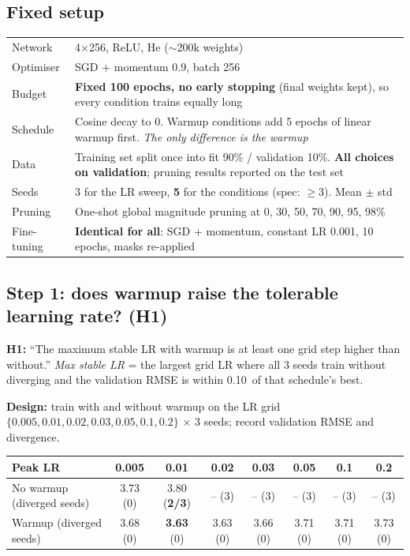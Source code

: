 \documentclass[11pt,a4paper]{article}
\newcommand{\A}{\,\text{\AA}}
\begin{document}
\subsection{Fixed setup}
\begin{tabularx}{\linewidth}{@{}lY@{}}
\toprule
Network & 4$\times$256, ReLU, He ($\sim$200k weights) \\
Optimiser & SGD + momentum 0.9, batch 256 \\
Budget & \textbf{Fixed 100 epochs, no early stopping} (final weights kept), so every condition trains equally long \\
Schedule & Cosine decay to 0. Warmup conditions add 5 epochs of linear warmup first. \emph{The only difference is the warmup} \\
Data & Training set split once into fit 90\% / validation 10\%. \textbf{All choices on validation}; pruning results reported on the test set \\
Seeds & 3 for the LR sweep, \textbf{5} for the conditions (spec: $\geq 3$). Mean $\pm$ std \\
Pruning & One-shot global magnitude pruning at 0, 30, 50, 70, 90, 95, 98\% \\
Fine-tuning & \textbf{Identical for all}: SGD + momentum, constant LR 0.001, 10 epochs, masks re-applied \\
\bottomrule
\end{tabularx}

\subsection{Step 1: does warmup raise the tolerable learning rate? (H1)}
\textbf{H1:} ``The maximum stable LR with warmup is at least one grid step higher than without.''
\emph{Max stable LR} = the largest grid LR where all 3 seeds train without diverging and the validation RMSE is within
0.10\A{} of that schedule's best.

\textbf{Design:} train with and without warmup on the LR grid $\{0.005, 0.01, 0.02, 0.03, 0.05, 0.1, 0.2\}$ $\times$ 3
seeds; record validation RMSE and divergence.

\begin{center}
\small
\begin{tabular}{@{}lccccccc@{}}
\toprule
Peak LR & 0.005 & 0.01 & 0.02 & 0.03 & 0.05 & 0.1 & 0.2 \\
\midrule
No warmup (diverged seeds) & 3.73 (0) & 3.80 (\textbf{2/3}) & -- (3) & -- (3) & -- (3) & -- (3) & -- (3) \\
Warmup (diverged seeds) & 3.68 (0) & \textbf{3.63} (0) & 3.63 (0) & 3.66 (0) & 3.71 (0) & 3.71 (0) & 3.73 (0) \\
\bottomrule
\end{tabular}
\end{center}
\end{document}
